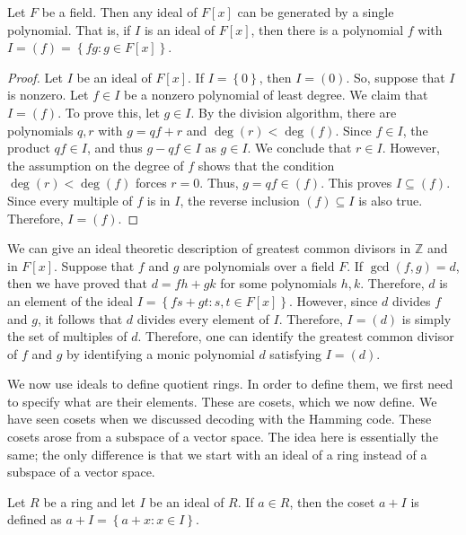 \begin{theorem}
Let $F$ be a field. Then any ideal of $F[x]$ can be generated by a single
polynomial. That is, if $I$ is an ideal of $F[x]$, then there is a polynomial
$f$ with $I=(f)=\left\{  fg:g\in F[x]\right\}  $.
\end{theorem}

\begin{proof}
Let $I$ be an ideal of $F[x]$. If $I=\left\{  0\right\}  $, then $I=(0)$. So,
suppose that $I$ is nonzero. Let $f\in I$ be a nonzero polynomial of least
degree. We claim that $I=(f)$. To prove this, let $g\in I$. By the division
algorithm, there are polynomials $q,r$ with $g=qf+r$ and $\deg(r)<\deg(f)$.
Since $f\in I$, the product $qf\in I$, and thus $g-qf\in I$ as $g\in I$. We
conclude that $r\in I$. However, the assumption on the degree of $f$ shows
that the condition $\deg(r)<\deg(f)$ forces $r=0$. Thus, $g=qf\in(f) $. This
proves $I\subseteq(f)$. Since every multiple of $f$ is in $I$, the reverse
inclusion $(f)\subseteq I$ is also true. Therefore, $I=(f)$.
\end{proof}


We can give an ideal theoretic description of greatest common divisors in
$\mathbb{Z}$ and in $F[x]$. Suppose that $f$ and $g$ are polynomials over a
field $F$. If $\gcd(f,g)=d$, then we have proved that $d=fh+gk$ for some
polynomials $h,k$. Therefore, $d$ is an element of the ideal $I=\left\{
fs+gt:s,t\in F[x]\right\}  $. However, since $d$ divides $f$ and $g$, it
follows that $d$ divides every element of $I$. Therefore, $I=(d)$ is simply
the set of multiples of $d$. Therefore, one can identify the greatest common
divisor of $f$ and $g$ by identifying a monic polynomial $d$ satisfying
$I=(d)$.

We now use ideals to define quotient rings. In order to define them, we first
need to specify what are their elements. These are cosets, which we now
define. We have seen cosets when we discussed decoding with the Hamming code.
These cosets arose from a subspace of a vector space. The idea here is
essentially the same; the only difference is that we start with an ideal of a
ring instead of a subspace of a vector space.

\begin{definition}
Let $R$ be a ring and let $I$ be an ideal of $R$. If $a\in R$, then the coset
$a+I$ is defined as $a+I=\left\{  a+x:x\in I\right\}  $.
\end{definition}

